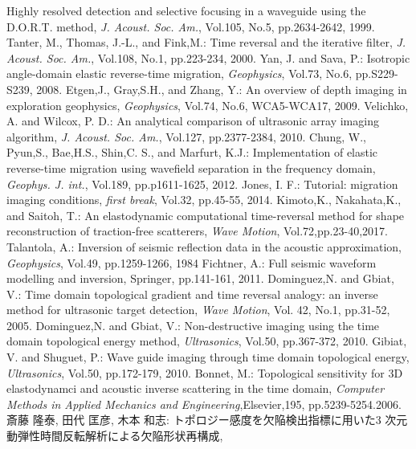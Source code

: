 ﻿\documentclass{jjsce}
\begin{document}
\begin{thebibliography}{9}
	Highly resolved detection and selective focusing in a waveguide using the D.O.R.T. method,
	\textit{ J. Acoust. Soc. Am.}, Vol.105, No.5, pp.2634-2642, 1999. 
	Tanter, M., Thomas, J.-L., and Fink,M.:
	Time reversal and the iterative filter, 
	\textit{ J. Acoust. Soc. Am.}, Vol.108, No.1, pp.223-234, 2000. 
	 Yan, J. and Sava, P.:
	Isotropic angle-domain elastic reverse-time migration,
	\textit{ Geophysics}, Vol.73, No.6, pp.S229-S239, 2008. 
	Etgen,J., Gray,S.H., and Zhang, Y.: 
	An overview of depth imaging in exploration geophysics,
	\textit{ Geophysics}, Vol.74, No.6, WCA5-WCA17, 2009.
	Velichko, A.  and Wilcox, P. D.:
	An analytical comparison of ultrasonic array imaging algorithm,
	\textit{ J. Acoust. Soc. Am.}, Vol.127, pp.2377-2384, 2010.
	Chung, W., Pyun,S., Bae,H.S., Shin,C. S., and Marfurt, K.J.:
	Implementation of elastic reverse-time migration using wavefield separation in the frequency domain,
	\textit{Geophys. J. int.}, Vol.189, pp.p1611-1625, 2012. 
	Jones, I. F.:
	Tutorial: migration imaging conditions, 
	\textit{first break}, Vol.32, pp.45-55, 2014.
	Kimoto,K.,  Nakahata,K., and Saitoh, T.: 
	An elastodynamic computational time-reversal method for shape reconstruction 
	of traction-free scatterers, \textit{Wave Motion}, Vol.72,pp.23-40,2017.
	Talantola, A.:
	Inversion of seismic reflection data in the acoustic approximation, 
	\textit{Geophysics}, Vol.49, pp.1259-1266, 1984
	Fichtner, A.: Full seismic waveform modelling and inversion,
	Springer, pp.141-161, 2011. 
	Dominguez,N. and Gbiat, V.:
	Time domain topological gradient and time reversal analogy: 
	an inverse method for ultrasonic target detection, 
	\textit{ Wave Motion}, Vol. 42, No.1, pp.31-52, 2005.
	Dominguez,N. and Gbiat, V.:
	Non-destructive imaging using the time domain topological energy method,
	\textit{ Ultrasonics}, Vol.50, pp.367-372, 2010.
	Gibiat, V. and Shuguet, P.:
	Wave guide imaging through time domain topological energy,
	\textit{ Ultrasonics}, Vol.50, pp.172-179, 2010.
	Bonnet, M.: 
	Topological sensitivity for 3D elastodynamci and acoustic inverse scattering in the time domain,
	\textit{Computer Methods in Applied Mechanics and Engineering},Elsevier,195, pp.5239-5254.2006.
	斎藤 隆泰, 田代 匡彦, 木本 和志: 
	トポロジー感度を欠陥検出指標に用いた3 次元動弾性時間反転解析による欠陥形状再構成, 

\end{thebibliography}
\end{document}
